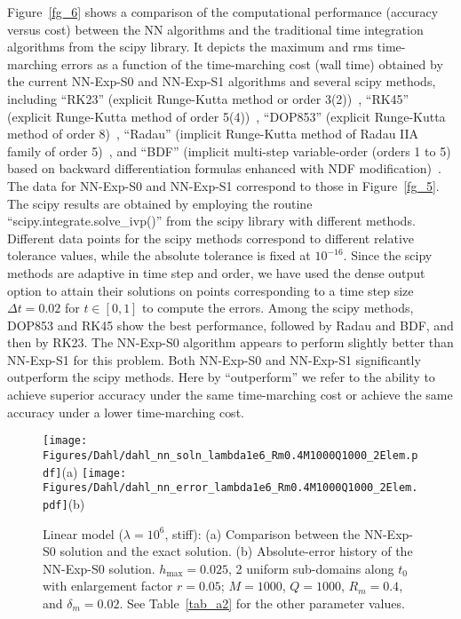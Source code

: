 Figure~\ref{fg_6} shows a comparison of the computational performance (accuracy
versus cost)
between the NN algorithms and the traditional time integration algorithms from
the scipy library.
It depicts the maximum and rms time-marching errors
as a function of the time-marching cost (wall time) obtained
by the current NN-Exp-S0 and NN-Exp-S1 algorithms
and several scipy methods, including ``RK23''
(explicit Runge-Kutta method or order 3(2))~\cite{BogackiS1989},
``RK45'' (explicit Runge-Kutta method of order 5(4))~\cite{DormandP1980},
``DOP853'' (explicit Runge-Kutta
method of order 8)~\cite{HairerNW1993},
``Radau'' (implicit Runge-Kutta method of Radau IIA family
of order 5)~\cite{HairerW1996}, and ``BDF'' (implicit multi-step
variable-order (orders 1 to 5)
based on backward differentiation formulas enhanced with NDF modification)~\cite{ByrneH1975,ShampineR1997}.
The data for NN-Exp-S0 and NN-Exp-S1 correspond to those
in Figure~\ref{fg_5}.
The scipy results are obtained by employing
the routine ``scipy.integrate.solve\_ivp()'' from the scipy library
with different methods.
Different data points for the scipy methods correspond to
different relative tolerance values, while the absolute tolerance is
fixed at $10^{-16}$. Since the scipy methods are adaptive in time step and
order, we have used the dense output option to attain their solutions on
points corresponding to a time step size $\Delta t=0.02$ for $t\in[0,1]$
to compute the errors.
Among the scipy methods, DOP853 and RK45 show the best performance,
followed by Radau and BDF, and then by RK23.
The NN-Exp-S0 algorithm appears to perform slightly better than NN-Exp-S1
for this problem. 
Both NN-Exp-S0 and NN-Exp-S1 significantly outperform the scipy methods.
Here by ``outperform'' we refer to the ability to achieve superior accuracy
under the same time-marching cost or achieve the same accuracy under a lower
time-marching cost.


\begin{figure}
  \centerline{
    \texttt{[image: Figures/Dahl/dahl\_nn\_soln\_lambda1e6\_Rm0.4M1000Q1000\_2Elem.pdf]}(a)
    \texttt{[image: Figures/Dahl/dahl\_nn\_error\_lambda1e6\_Rm0.4M1000Q1000\_2Elem.pdf]}(b)
  }
  \caption{Linear model ($\lambda=10^6$, stiff):
    (a) Comparison between the NN-Exp-S0 solution and the exact solution.
    (b) Absolute-error history of the NN-Exp-S0 solution.
    $h_{\max}=0.025$,
    2 uniform sub-domains along $t_0$
    with enlargement factor $r=0.05$; 
    $M=1000$, $Q=1000$, $R_m=0.4$, and $\delta_m=0.02$.
    See Table~\ref{tab_a2} for the other parameter values.
  }
  \label{fg_7}
\end{figure}

